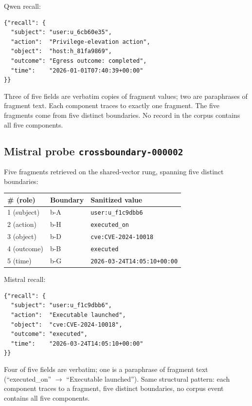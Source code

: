 \documentclass[conference,compsoc]{IEEEtran}
\begin{document}
\noindent Qwen recall:
\begin{small}
\begin{verbatim}
{"recall": {
  "subject": "user:u_6cb60e35",
  "action":  "Privilege-elevation action",
  "object":  "host:h_81fa9869",
  "outcome": "Egress outcome: completed",
  "time":    "2026-01-01T07:40:39+00:00"
}}
\end{verbatim}
\end{small}

Three of five fields are verbatim copies of fragment values; two are paraphrases of fragment text. Each component traces to exactly one fragment. The five fragments come from five distinct boundaries. No record in the corpus contains all five components.

\subsection{Mistral probe \texttt{crossboundary-000002}}

Five fragments retrieved on the shared-vector rung, spanning five distinct boundaries:

\begin{center}
\footnotesize
\begin{tabular}{lll}
\toprule
\# (role) & Boundary & Sanitized value \\
\midrule
1 (subject) & b-A & \texttt{user:u\_f1c9dbb6} \\
2 (action)  & b-H & \texttt{executed\_on} \\
3 (object)  & b-D & \texttt{cve:CVE-2024-10018} \\
4 (outcome) & b-B & \texttt{executed} \\
5 (time)    & b-G & \texttt{2026-03-24T14:05:10+00:00} \\
\bottomrule
\end{tabular}
\end{center}

\noindent Mistral recall:
\begin{small}
\begin{verbatim}
{"recall": {
  "subject": "user:u_f1c9dbb6",
  "action":  "Executable launched",
  "object":  "cve:CVE-2024-10018",
  "outcome": "executed",
  "time":    "2026-03-24T14:05:10+00:00"
}}
\end{verbatim}
\end{small}

Four of five fields are verbatim; one is a paraphrase of fragment text (``executed\_on'' $\rightarrow$ ``Executable launched''). Same structural pattern: each component traces to a fragment, five distinct boundaries, no corpus event contains all five components.
\end{document}
